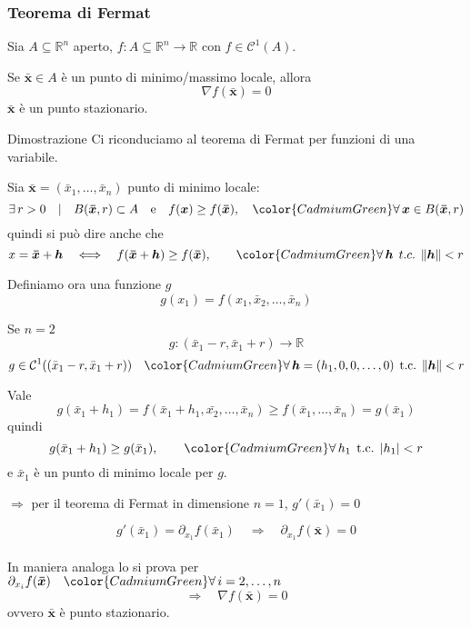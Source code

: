 \documentclass[x11names]{article}
\begin{document}
	
	\begin{center}
		\colorbox{myred}{\begin{minipage}{5.75in}
				\begin{redes}{}
					\subsubsection{\textbf{Teorema di Fermat}}
					Sia \(A\subseteq \mathbb{R}^n\) aperto, \(f:A\subseteq \mathbb{R}^n \to \mathbb{R}\) con \(f\in\mathcal{C}^1(A)\). 
					
					Se \(\boldsymbol{\bar{x}} \in A\) è un punto di minimo/massimo locale, allora
					\[ 
					\nabla f(\boldsymbol{\bar{x}}) = 0
					\]
					\(\boldsymbol{\bar{x}}\) è un punto stazionario.
				\end{redes}
		\end{minipage}}
	\end{center}
	\begin{es}{Dimostrazione}
		Ci riconduciamo al teorema di Fermat per funzioni di una variabile.
		
		Sia \(\boldsymbol{\bar{x}} = (\bar{x}_{1},\dots,\bar{x}_{n})\) punto  di minimo locale:
		\[ 
		\exists \,r> 0 \quad | \quad B(\boldsymbol{\bar{x}},r) \subset A \quad \text{e} \quad f(\boldsymbol{x}) \geq f(\boldsymbol{\bar{x}}), \quad {\color{CadmiumGreen}\forall\, \boldsymbol{x} \in B(\boldsymbol{\bar{x}},r)}
		\]
		quindi si può dire anche che
		\[ 
		x = \boldsymbol{\bar{x}} + \boldsymbol{h} \quad \Longleftrightarrow \quad f(\boldsymbol{\bar{x}} + \boldsymbol{h}) \geq f(\boldsymbol{\bar{x}}),\qquad {\color{CadmiumGreen}\forall\, \boldsymbol{h} \;\, t.c. \;\, \|\boldsymbol{h}\| < r}
		\]
		
		Definiamo ora una funzione \(g\)
		\[
		g(x_{1}) = f(x_{1},\bar{x}_{2},\dots,\bar{x}_{n})
		\]
		
		Se \(\boxed{n=2}\)
		\[ 
		g: (\bar{x}_{1} -r, \bar{x}_{1}+r) \to \mathbb{R}
		\]
		\[ 
		g \in \mathcal{C}^1((\bar{x}_{1} -r, \bar{x}_{1}+r)) \quad {\color{CadmiumGreen}\forall\,\boldsymbol{h} = (h_{1},0,0,\dots,0) \;\, \text{t.c.} \;\, \|\boldsymbol{h}\| < r}
		\]
		
		Vale
		\[ 
		g(\bar{x}_{1} + h_{1}) = f(\bar{x}_{1} + h_{1},\bar{x_{2}},\dots,\bar{x}_{n}) \geq f(\bar{x}_{1},\dots,\bar{x}_{n}) = g(\bar{x}_{1})
		\]
		quindi
		\[ 
		g(\bar{x}_{1} + h_{1}) \geq g(\bar{x}_{1}), \qquad {\color{CadmiumGreen}\forall\,h_{1} \;\, \text{t.c.}\;\, |h_{1}| < r}
		\]
		e \(\bar{x}_{1}\) è un punto di minimo locale per \(g\).
		
		
		\begin{center}
			\(\Longrightarrow\) per il teorema di Fermat in dimensione \(n=1\), \(g'(\bar{x}_{1}) = 0\)
		\end{center}
		\[ 
		g'(\bar{x}_{1})  = \partial_{x_{1}}f(\bar{x}_{1}) \quad \Longrightarrow \quad \partial_{x_{1}}f(\boldsymbol{\bar{x}}) = 0
		\]\\
		In maniera analoga lo si prova per \(\partial_{x_i}f(\boldsymbol{\bar{x}}) \quad {\color{CadmiumGreen}\forall\,i = 2,\dots,n}\)
		\[ 
		\Longrightarrow \quad \nabla f(\boldsymbol{\bar{x}})  = 0
		\]
		ovvero \(\boldsymbol{\bar{x}}\) è punto stazionario.
	\end{es}
	
\end{document}
